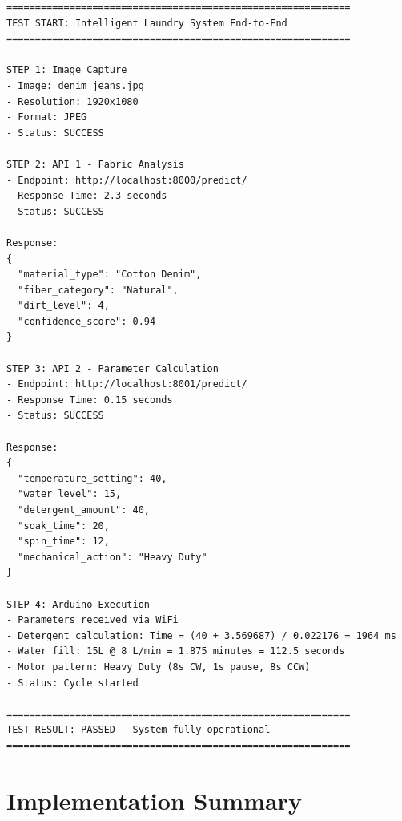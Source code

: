 \begin{small}
\begin{verbatim}
============================================================
TEST START: Intelligent Laundry System End-to-End
============================================================

STEP 1: Image Capture
- Image: denim_jeans.jpg
- Resolution: 1920x1080
- Format: JPEG
- Status: SUCCESS

STEP 2: API 1 - Fabric Analysis
- Endpoint: http://localhost:8000/predict/
- Response Time: 2.3 seconds
- Status: SUCCESS

Response:
{
  "material_type": "Cotton Denim",
  "fiber_category": "Natural",
  "dirt_level": 4,
  "confidence_score": 0.94
}

STEP 3: API 2 - Parameter Calculation
- Endpoint: http://localhost:8001/predict/
- Response Time: 0.15 seconds
- Status: SUCCESS

Response:
{
  "temperature_setting": 40,
  "water_level": 15,
  "detergent_amount": 40,
  "soak_time": 20,
  "spin_time": 12,
  "mechanical_action": "Heavy Duty"
}

STEP 4: Arduino Execution
- Parameters received via WiFi
- Detergent calculation: Time = (40 + 3.569687) / 0.022176 = 1964 ms
- Water fill: 15L @ 8 L/min = 1.875 minutes = 112.5 seconds
- Motor pattern: Heavy Duty (8s CW, 1s pause, 8s CCW)
- Status: Cycle started

============================================================
TEST RESULT: PASSED - System fully operational
============================================================
\end{verbatim}
\end{small}

\section{Implementation Summary}

